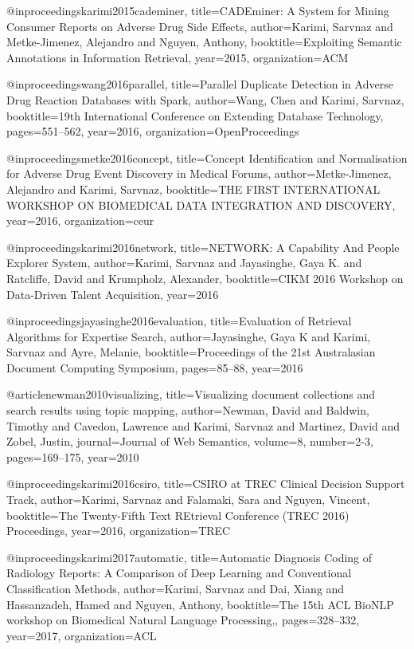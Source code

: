 @inproceedings{karimi2015cademiner,
  title={CADEminer: A System for Mining Consumer Reports on Adverse Drug Side Effects},
  author={Karimi, Sarvnaz and Metke-Jimenez, Alejandro and Nguyen, Anthony},
  booktitle={Exploiting Semantic Annotations in Information Retrieval},
  year={2015},
  organization={ACM}
}

@inproceedings{wang2016parallel,
  title={Parallel Duplicate Detection in Adverse Drug Reaction Databases with Spark},
  author={Wang, Chen and Karimi, Sarvnaz},
  booktitle={19th International Conference on Extending Database Technology},
  pages={551--562},
  year={2016},
  organization={OpenProceedings}
}

@inproceedings{metke2016concept,
  title={Concept Identification and Normalisation for Adverse Drug Event Discovery in Medical Forums},
  author={Metke-Jimenez, Alejandro and Karimi, Sarvnaz},
  booktitle={THE FIRST INTERNATIONAL WORKSHOP ON BIOMEDICAL DATA INTEGRATION AND DISCOVERY},
  year={2016},
  organization={ceur}
}

@inproceedings{karimi2016network,
  title={NETWORK: A Capability And People Explorer System},
  author={Karimi, Sarvnaz and Jayasinghe, Gaya K. and Ratcliffe, David and Krumpholz, Alexander},
  booktitle={CIKM 2016 Workshop on Data-Driven Talent Acquisition},
  year={2016}
}

@inproceedings{jayasinghe2016evaluation,
  title={Evaluation of Retrieval Algorithms for Expertise Search},
  author={Jayasinghe, Gaya K and Karimi, Sarvnaz and Ayre, Melanie},
  booktitle={Proceedings of the 21st Australasian Document Computing Symposium},
  pages={85--88},
  year={2016}
}

@article{newman2010visualizing,
  title={Visualizing document collections and search results using topic mapping},
  author={Newman, David and Baldwin, Timothy and Cavedon, Lawrence and Karimi, Sarvnaz and Martinez, David and Zobel, Justin},
  journal={Journal of Web Semantics},
  volume={8},
  number={2-3},
  pages={169--175},
  year={2010}
}

@inproceedings{karimi2016csiro,
  title={CSIRO at TREC Clinical Decision Support Track},
  author={Karimi, Sarvnaz and Falamaki, Sara and Nguyen, Vincent},
  booktitle={The Twenty-Fifth Text REtrieval Conference (TREC 2016) Proceedings},
  year={2016},
  organization={TREC}
}

@inproceedings{karimi2017automatic,
  title={Automatic Diagnosis Coding of Radiology Reports: A Comparison of Deep Learning and Conventional Classification Methods},
  author={Karimi, Sarvnaz and Dai, Xiang and Hassanzadeh, Hamed and Nguyen, Anthony},
  booktitle={The 15th ACL BioNLP workshop on Biomedical Natural Language Processing,},
  pages={328--332},
  year={2017},
  organization={ACL}
}

